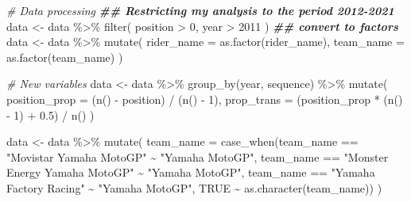 \documentclass[
]{article}
\newenvironment{Shaded}{\begin{snugshade}}{\end{snugshade}}
\newcommand{\AttributeTok}[1]{\textcolor[rgb]{0.77,0.63,0.00}{#1}}
\newcommand{\CommentTok}[1]{\textcolor[rgb]{0.56,0.35,0.01}{\textit{#1}}}
\newcommand{\ConstantTok}[1]{\textcolor[rgb]{0.00,0.00,0.00}{#1}}
\newcommand{\DecValTok}[1]{\textcolor[rgb]{0.00,0.00,0.81}{#1}}
\newcommand{\DocumentationTok}[1]{\textcolor[rgb]{0.56,0.35,0.01}{\textbf{\textit{#1}}}}
\newcommand{\FloatTok}[1]{\textcolor[rgb]{0.00,0.00,0.81}{#1}}
\newcommand{\FunctionTok}[1]{\textcolor[rgb]{0.00,0.00,0.00}{#1}}
\newcommand{\NormalTok}[1]{#1}
\newcommand{\OtherTok}[1]{\textcolor[rgb]{0.56,0.35,0.01}{#1}}
\newcommand{\SpecialCharTok}[1]{\textcolor[rgb]{0.00,0.00,0.00}{#1}}
\newcommand{\StringTok}[1]{\textcolor[rgb]{0.31,0.60,0.02}{#1}}
\begin{document}
\begin{Shaded}
\begin{Highlighting}[]
\CommentTok{\# Data processing }
\DocumentationTok{\#\# Restricting my analysis to the period 2012{-}2021}
\NormalTok{data }\OtherTok{\textless{}{-}}\NormalTok{ data }\SpecialCharTok{\%\textgreater{}\%} \FunctionTok{filter}\NormalTok{(}
\NormalTok{  position }\SpecialCharTok{\textgreater{}} \DecValTok{0}\NormalTok{,}
\NormalTok{  year }\SpecialCharTok{\textgreater{}} \DecValTok{2011}
\NormalTok{)}
\DocumentationTok{\#\# convert to factors}
\NormalTok{data }\OtherTok{\textless{}{-}}\NormalTok{ data }\SpecialCharTok{\%\textgreater{}\%} \FunctionTok{mutate}\NormalTok{(}
  \AttributeTok{rider\_name  =} \FunctionTok{as.factor}\NormalTok{(rider\_name),}
  \AttributeTok{team\_name  =} \FunctionTok{as.factor}\NormalTok{(team\_name)}
\NormalTok{)}

\CommentTok{\# New variables}
\NormalTok{data }\OtherTok{\textless{}{-}}\NormalTok{ data }\SpecialCharTok{\%\textgreater{}\%} \FunctionTok{group\_by}\NormalTok{(year, sequence) }\SpecialCharTok{\%\textgreater{}\%} \FunctionTok{mutate}\NormalTok{(  }
  \AttributeTok{position\_prop =}\NormalTok{ (}\FunctionTok{n}\NormalTok{() }\SpecialCharTok{{-}}\NormalTok{ position) }\SpecialCharTok{/}\NormalTok{ (}\FunctionTok{n}\NormalTok{() }\SpecialCharTok{{-}} \DecValTok{1}\NormalTok{),        }
  \AttributeTok{prop\_trans =}\NormalTok{ (position\_prop }\SpecialCharTok{*}\NormalTok{ (}\FunctionTok{n}\NormalTok{() }\SpecialCharTok{{-}} \DecValTok{1}\NormalTok{) }\SpecialCharTok{+} \FloatTok{0.5}\NormalTok{) }\SpecialCharTok{/} \FunctionTok{n}\NormalTok{() }
\NormalTok{  )}

\NormalTok{data }\OtherTok{\textless{}{-}}\NormalTok{ data }\SpecialCharTok{\%\textgreater{}\%} 
  \FunctionTok{mutate}\NormalTok{(}
    \AttributeTok{team\_name =} \FunctionTok{case\_when}\NormalTok{(team\_name }\SpecialCharTok{==} \StringTok{"Movistar Yamaha MotoGP"} \SpecialCharTok{\textasciitilde{}} \StringTok{"Yamaha MotoGP"}\NormalTok{,}
\NormalTok{                          team\_name }\SpecialCharTok{==} \StringTok{"Monster Energy Yamaha MotoGP"} \SpecialCharTok{\textasciitilde{}} \StringTok{"Yamaha MotoGP"}\NormalTok{,}
\NormalTok{                          team\_name }\SpecialCharTok{==} \StringTok{"Yamaha Factory Racing"} \SpecialCharTok{\textasciitilde{}} \StringTok{"Yamaha MotoGP"}\NormalTok{,}
                          \ConstantTok{TRUE} \SpecialCharTok{\textasciitilde{}} \FunctionTok{as.character}\NormalTok{(team\_name))}
\NormalTok{  )}
\end{Highlighting}
\end{Shaded}
\end{document}
